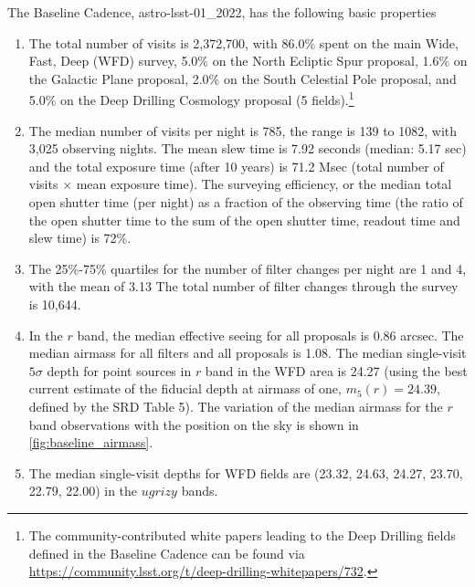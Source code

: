 \documentclass[DM,lsstdraft,authoryear,toc]{lsstdoc}
\begin{document}
The Baseline Cadence,
astro-lsst-01\_2022, has the following basic
properties
\begin{enumerate}
\item The total number of visits is 2,372,700, with 86.0\% spent on
the main Wide, Fast, Deep (WFD) survey, 5.0\% on the
North Ecliptic Spur proposal, 1.6\% on the Galactic Plane proposal, 2.0\%
on the South Celestial Pole proposal, and 5.0\% on the Deep Drilling
Cosmology proposal (5 fields).\footnote{The community-contributed white papers leading to the
Deep Drilling fields defined in the Baseline Cadence can be found via
\url{https://community.lsst.org/t/deep-drilling-whitepapers/732}.}
\item The median number of visits per night is 785, the range is
139 to 1082, with 3,025 observing nights. The mean slew time is 7.92
seconds (median: 5.17 sec) and the total exposure time (after 10 years) is 71.2 Msec (total number of visits $\times$ mean exposure time).
The surveying efficiency, or the median total open shutter time (per night)
as a fraction of the observing time (the ratio of the open shutter time to
the sum of the open shutter time, readout time and slew time) is 72\%.
\item
The 25\%-75\% quartiles for the number of filter changes per night are 1
and 4, with the mean of 3.13 The total number of filter changes through the survey is 10,644.
\item In the $r$ band, the median effective seeing for all proposals is 0.86 arcsec.
The median airmass for all filters and all proposals is 1.08.
The median single-visit $5\sigma$ depth for point sources in $r$ band in the WFD area is 24.27 (using the best
current estimate of the fiducial depth at airmass of one, $m_5(r)=24.39$,
defined by the SRD Table 5). The variation of the median airmass for the $r$
band observations with the position on the sky is shown in
\autoref{fig:baseline_airmass}.
\item The median single-visit depths for WFD fields are (23.32, 24.63, 24.27,
23.70, 22.79, 22.00) in the $ugrizy$ bands.

\end{enumerate}
\end{document}
